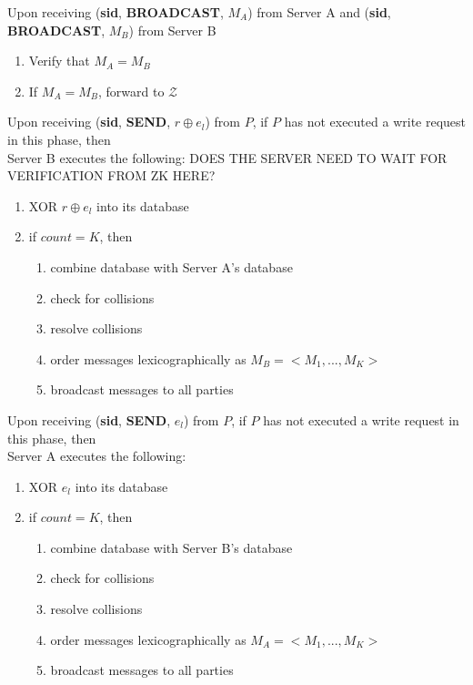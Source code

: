 \begin{tcolorbox}[colback=white, arc=5pt]
\extitem Upon receiving (\textbf{sid}, \textbf{BROADCAST}, $M_A$) from Server A and (\textbf{sid}, \textbf{BROADCAST}, $M_B$) from Server B
\begin{enumerate}
    \item Verify that $M_A = M_B$
    \item If $M_A = M_B$, forward to $\mathcal{Z}$
\end{enumerate}

\extitem Upon receiving (\textbf{sid}, \textbf{SEND}, $r\oplus e_l$) from $P$, if $P$ has not executed a write request in this phase, then \\
    Server B executes the following:
    DOES THE SERVER NEED TO WAIT FOR VERIFICATION FROM ZK HERE?
    \begin{enumerate}
        \item XOR $r\oplus e_l$ into its database  
        \item if $count=K$, then
        \begin{enumerate}
            \item combine database with Server A's database
            \item check for collisions
            \item resolve collisions
            \item order messages lexicographically as $M_B=<M_1,...,M_K>$
            \item broadcast messages to all parties
        \end{enumerate}
    \end{enumerate}

\extitem Upon receiving (\textbf{sid}, \textbf{SEND}, $e_l$) from $P$, if $P$ has not executed a write request in this phase, then \\
    Server A executes the following:
    \begin{enumerate}
        \item XOR $e_l$ into its database
        \item if $count=K$, then
        \begin{enumerate}
            \item combine database with Server B's database
            \item check for collisions
            \item resolve collisions
            \item order messages lexicographically as $M_A=<M_1,...,M_K>$
            \item broadcast messages to all parties
        \end{enumerate}
    \end{enumerate}
\end{tcolorbox}

\label{fig:riposte_protocol}